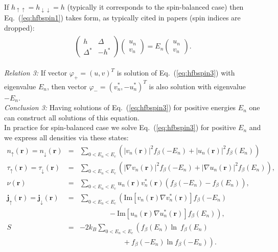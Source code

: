 \documentclass[a4paper,10pt]{article}
\newcommand{\abs}[1]{\lvert{#1}\rvert}            %
\begin{document}
If $h_{\uparrow \uparrow}=h_{\downarrow \downarrow}=h$ (typically it corresponds to the spin-balanced case) then Eq.~(\ref{eq:hfbspin1}) takes form, as typically cited in papers (spin indices are dropped):
\begin{align}\label{eq:hfbspin3}
\begin{gathered}
\begin{pmatrix}
h  &  \Delta \\
\Delta^* &  -h^*
\end{pmatrix} 
\begin{pmatrix}
u_{n} \\
v_{n}
\end{pmatrix}
= E_n
\begin{pmatrix}
u_{n} \\
v_{n}
\end{pmatrix} .
\end{gathered}
\end{align}

\noindent\textit{Relation 3:} If vector $\varphi_{+}=\left( u,v\right)^{T}$ is solution of Eq.~(\ref{eq:hfbspin3}) with eigenvalue $E_n$, then vector $\varphi_{-}=(v_{n}^*,-u_{n}^*)^{T}$ is also solution with eigenvalue $-E_n$.\\

\noindent\textit{Conclusion 3:} Having solutions of Eq.~(\ref{eq:hfbspin3}) for positive energies $E_n$ one can construct all solutions of this equation.\\
In practice for spin-balanced case we solve Eq.~(\ref{eq:hfbspin3}) for positive $E_n$ and we express all densities via these states:
\begin{eqnarray}
n_{\uparrow}(\bm{r})=n_{\downarrow}(\bm{r}) &=& \sum_{0<E_n<E_c}\left( \abs{v_{n}(\bm{r})}^2 f_{\beta}(-E_n)+\abs{u_{n}(\bm{r})}^2 f_{\beta}(E_n)\right) \\
\tau_{\uparrow}(\bm{r})=\tau_{\downarrow}(\bm{r}) &=& \sum_{0<E_n<E_c}\left( \abs{\nabla v_{n}(\bm{r})}^2 f_{\beta}(-E_n) + \abs{\nabla u_{n}(\bm{r})}^2 f_{\beta}(E_n)\right) ,\\
\nu(\bm{r}) &=& \sum_{0<E_n<E_c} u_{n}(\bm{r})v_{n}^{*}(\bm{r})\left( f_{\beta}(-E_n)-f_{\beta}(E_n)\right) ,\\
\bm{j}_{\uparrow}(\bm{r})=\bm{j}_{\downarrow}(\bm{r}) &=& \sum_{0<E_n<E_c}\left(  \textrm{Im}[v_{n}(\bm{r})\nabla v_{n}^*(\bm{r})] f_{\beta}(-E_n)\right.\nonumber \\
&& \quad\quad\quad\quad - \left. \textrm{Im}[u_{n}(\bm{r})\nabla u_{n}^*(\bm{r})] f_{\beta}(E_n) \right), \\
S&=&-2k_B\sum_{0<E_n<E_c}\left( f_{\beta}(E_n)\ln\ f_{\beta}(E_n)\right. \nonumber \\
&& \quad\quad\quad\quad\quad\quad + \left. f_{\beta}(-E_n)\ln f_{\beta}(-E_n)\right).
\label{eqn:densities2}
\end{eqnarray}
\end{document}
